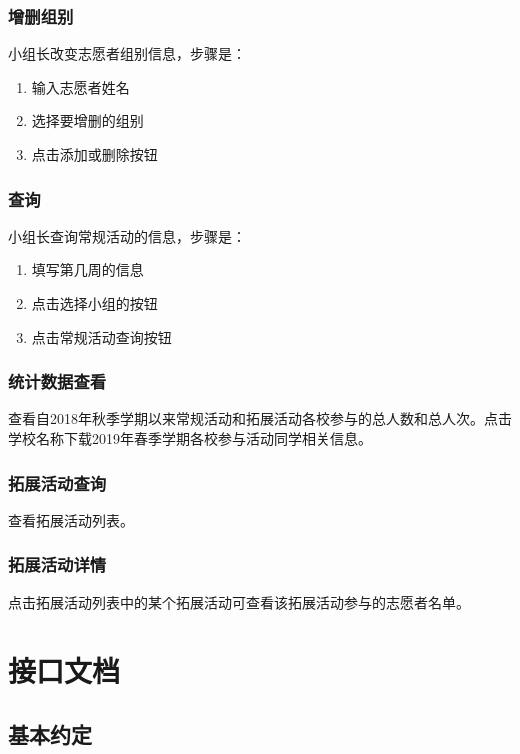 \documentclass[]{ctexart}
\begin{document}
\subsubsection{增删组别}
小组长改变志愿者组别信息，步骤是：
\begin{enumerate}
\item 输入志愿者姓名
\item 选择要增删的组别
\item 点击添加或删除按钮
\end{enumerate}

\subsubsection{查询}
小组长查询常规活动的信息，步骤是：
\begin{enumerate}
\item 填写第几周的信息
\item 点击选择小组的按钮
\item 点击常规活动查询按钮
\end{enumerate}

\subsubsection{统计数据查看}
查看自2018年秋季学期以来常规活动和拓展活动各校参与的总人数和总人次。点击学校名称下载2019年春季学期各校参与活动同学相关信息。

\subsubsection{拓展活动查询}
查看拓展活动列表。

\subsubsection{拓展活动详情}
点击拓展活动列表中的某个拓展活动可查看该拓展活动参与的志愿者名单。

\section{接口文档}\label{api}

\hypertarget{ux57faux672cux7ea6ux5b9a}{%
\subsection{基本约定}\label{ux57faux672cux7ea6ux5b9a}}
\end{document}

